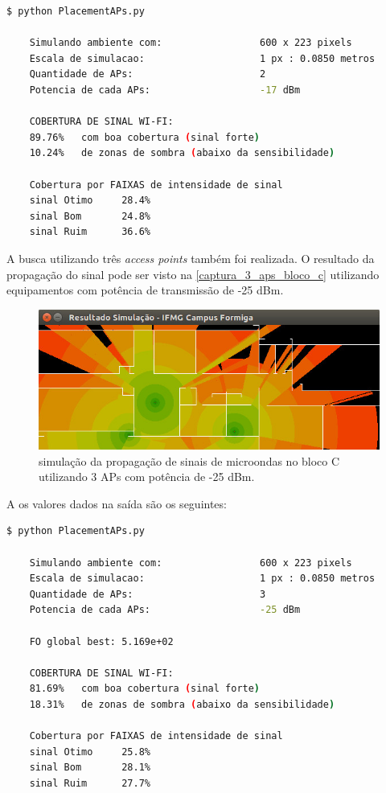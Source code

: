 \documentclass[
	12pt,				%
	openright,			%
	twoside,			%
	a4paper,			%
	english,			%
	french,				%
	spanish,			%
	brazil				%
	]{abntex2}
\begin{document}
\begin{lstlisting}[language=bash]
	$ python PlacementAPs.py 
	
	Simulando ambiente com:                 600 x 223 pixels
	Escala de simulacao:                    1 px : 0.0850 metros
	Quantidade de APs:                      2
	Potencia de cada APs:                   -17 dBm
	
	COBERTURA DE SINAL WI-FI:
	89.76%   com boa cobertura (sinal forte)
	10.24%   de zonas de sombra (abaixo da sensibilidade)
	
	Cobertura por FAIXAS de intensidade de sinal
	sinal Otimo     28.4%
	sinal Bom       24.8%
	sinal Ruim      36.6%


\end{lstlisting}


A busca utilizando três \textit{access points} também foi realizada. O resultado da propagação do sinal pode ser visto na \autoref{captura_3_aps_bloco_c} utilizando equipamentos com potência de transmissão de -25 dBm.

\begin{figure}[ht]
	\caption{\label{captura_3_aps_bloco_c}simulação da propagação de sinais de microondas no bloco C utilizando 3 APs com potência de -25 dBm.
	}
	\begin{center}
		\includegraphics[scale=0.7]{images/captura-3-aps-bloco-c.jpg}
	\end{center}
\end{figure}

A os valores dados na saída são os seguintes:

\begin{lstlisting}[language=bash]
	$ python PlacementAPs.py 
	
	Simulando ambiente com:                 600 x 223 pixels
	Escala de simulacao:                    1 px : 0.0850 metros
	Quantidade de APs:                      3
	Potencia de cada APs:                   -25 dBm
	
	FO global best: 5.169e+02
	
	COBERTURA DE SINAL WI-FI:
	81.69%   com boa cobertura (sinal forte)
	18.31%   de zonas de sombra (abaixo da sensibilidade)
	
	Cobertura por FAIXAS de intensidade de sinal
	sinal Otimo     25.8%
	sinal Bom       28.1%
	sinal Ruim      27.7%

\end{lstlisting}
\end{document}
